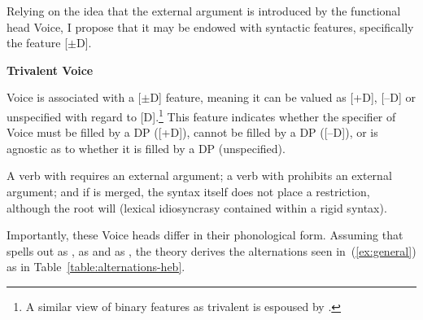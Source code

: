 \begin{exe}
\begin{xlist}
\begin{exe}
\begin{exe}
\begin{exe}
\begin{exe}
\begin{xlist}
\begin{exe}
\begin{xlist}
\begin{xlist}
\begin{xlist}
\begin{exe}
\begin{xlist}
\begin{exe}
\begin{exe}
\begin{xlist}
\begin{exe}
\begin{xlist}
\begin{exe}
\begin{exe}
\begin{xlist}
\begin{exe}
\begin{xlist}
\begin{exe}
\begin{xlist}
\begin{exe}
\begin{exe}
\begin{xlist}
\begin{exe}
\begin{exe}
\begin{xlist}
\begin{exe}
\begin{xlist}
\begin{exe}
\begin{xlist}
\begin{xlist}
\begin{exe}
\begin{exe}
\begin{xlist}
\begin{exe}
\begin{xlist}
\begin{exe}
\begin{xlist}
Relying on the idea that the external argument is introduced by the functional head Voice, I propose that it may be endowed with syntactic features, specifically the feature [$\pm$D].
 \begin{exe}
 \ex  \textbf{Trivalent Voice} 
 \begin{xlist} 
 	\ex  Voice is associated with a [$\pm$D] feature, meaning it can be valued as [+D], [--D] or unspecified with regard to [D].\footnote{A similar view of binary features as trivalent is espoused by \cite{harbour11}.} 
 	\ex  This feature indicates whether the specifier of Voice must be filled by a DP ([+D]), cannot be filled by a DP ([--D]), or is agnostic as to whether it is filled by a DP (unspecified). 
 \z
\z 

A verb with {\vd} requires an external argument; a verb with {\vz} prohibits an external argument; and if  is merged, the syntax itself does not place a restriction, although the root will (lexical idiosyncrasy contained within a rigid syntax).

Importantly, these Voice heads differ in their phonological form. Assuming that {\vd} spells out as {\thif}, {\vz} as {\tnif} and  as {\tkal}, the theory derives the alternations seen in~(\ref{ex:general}) as in Table~\ref{table:alternations-heb}.


\end{xlist}
\end{exe}
\end{xlist}
\end{exe}
\end{xlist}
\end{exe}
\end{xlist}
\end{exe}
\end{exe}
\end{xlist}
\end{xlist}
\end{exe}
\end{xlist}
\end{exe}
\end{xlist}
\end{exe}
\end{exe}
\end{xlist}
\end{exe}
\end{exe}
\end{xlist}
\end{exe}
\end{xlist}
\end{exe}
\end{xlist}
\end{exe}
\end{exe}
\end{xlist}
\end{exe}
\end{xlist}
\end{exe}
\end{exe}
\end{xlist}
\end{exe}
\end{xlist}
\end{xlist}
\end{xlist}
\end{exe}
\end{xlist}
\end{exe}
\end{exe}
\end{exe}
\end{exe}
\end{xlist}
\end{exe}
